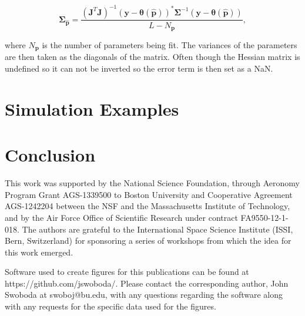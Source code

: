 \documentclass[draft,ras]{agutex}
\begin{document}
\begin{article}
\begin{equation}
\label{eqn:jacinv}
\bm{\Sigma}_{\hat{\mathbf{p}}}=\frac{(\mathbf{J}^T\mathbf{J})^{-1} (\mathbf{y}-\bm{\theta}(\hat{\mathbf{p}}))^*\bm{\Sigma}^{-1}(\mathbf{y}-\bm{\theta}(\hat{\mathbf{p}}))}{L-N_{\mathbf{p}}},
\end{equation}

\noindent where $N_{\mathbf{p}}$ is the number of parameters being fit. The variances of the parameters are then taken as the diagonals of the matrix. Often though the Hessian matrix is undefined so it can not be inverted so the error term is then set as a NaN.


\section{Simulation Examples}

\section{Conclusion}

\begin{acknowledgments}
This work was supported by the National Science Foundation, through Aeronomy Program Grant AGS-1339500 to Boston University and Cooperative Agreement AGS-1242204 between the NSF and the Massachusetts Institute of Technology, and by the Air Force Office of Scientific Research under contract FA9550-12-1-018.   The authors are grateful to the International Space Science Institute (ISSI, Bern, Switzerland) for sponsoring a series of workshops from which the idea for this work emerged. 

Software used to create figures for this publications can be found at https://github.com/jswoboda/. Please contact the corresponding author, John Swoboda at swoboj@bu.edu, with any questions regarding the software along with any requests for the specific data used for the figures. \end{acknowledgments}




\end{article}
\end{document}
